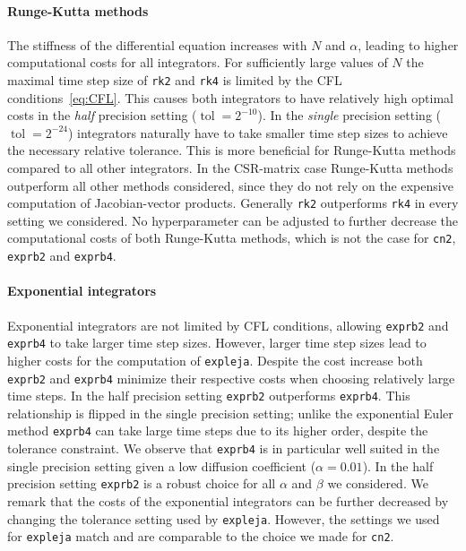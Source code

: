 \documentclass{scrartcl}
\begin{document}
	\paragraph{Runge-Kutta methods}
	The stiffness of the differential equation increases with $N$ and $\alpha$, leading to higher computational costs for all integrators. For sufficiently large values of $N$ the maximal time step size of \texttt{rk2} and \texttt{rk4} is limited by the CFL conditions~\ref{eq:CFL}. This causes both integrators to have relatively high optimal costs in the \textit{half} precision setting ($\operatorname{tol}=2^{-10}$). In the \textit{single} precision setting ($\operatorname{tol}=2^{-24}$) integrators naturally have to take smaller time step sizes to achieve the necessary relative tolerance. This is more beneficial for Runge-Kutta methods compared to all other integrators. In the CSR-matrix case Runge-Kutta methods outperform all other methods considered, since they do not rely on the expensive computation of Jacobian-vector products. Generally \texttt{rk2} outperforms \texttt{rk4} in every setting we considered. No hyperparameter can be adjusted to further decrease the computational costs of both Runge-Kutta methods, which is not the case for \texttt{cn2}, \texttt{exprb2} and \texttt{exprb4}.
	
	\paragraph{Exponential integrators}
	Exponential integrators are not limited by CFL conditions, allowing \texttt{exprb2} and \texttt{exprb4} to take larger time step sizes. However, larger time step sizes lead to higher costs for the computation of \texttt{expleja}. Despite the cost increase both \texttt{exprb2} and \texttt{exprb4} minimize their respective costs when choosing relatively large time steps. In the half precision setting \texttt{exprb2} outperforms \texttt{exprb4}. This relationship is flipped in the single precision setting; unlike the exponential Euler method \texttt{exprb4} can take large time steps due to its higher order, despite the tolerance constraint. We observe that \texttt{exprb4} is in particular well suited in the single precision setting given a low diffusion coefficient ($\alpha = 0.01$). In the half precision setting \texttt{exprb2} is a robust choice for all $\alpha$ and $\beta$ we considered. We remark that the costs of the exponential integrators can be further decreased by changing the tolerance setting used by \texttt{expleja}. However, the settings we used for \texttt{expleja} match \cite{lejarev} and are comparable to the choice we made for \texttt{cn2}. 
	
\end{document}
